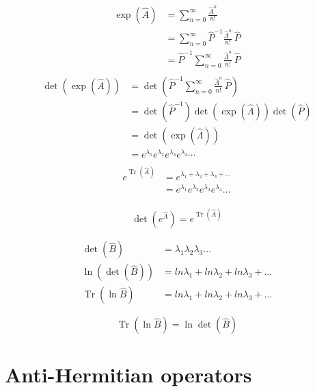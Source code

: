 \documentclass[12pt, letterpaper]{article}
\begin{document}
\begin{align*}
    \exp\left(\hat A\right) & = \sum_{n=0}^\infty \frac{\hat{A}^n} {n!} \\ 
    &= \sum_{n=0}^\infty  \hat{P}^{-1} \frac{\hat{\Lambda}^n} {n!}\, \hat{P}\\
    &= \hat{P}^{-1} \sum_{n=0}^\infty  \frac{\hat{\Lambda}^n} {n!}\, \hat{P}\\
\end{align*}
\begin{align*}
    \operatorname{det}\left(\exp\left(\hat A\right) \right)&= \operatorname{det}\left(\hat{P}^{-1} \sum_{n=0}^\infty  \frac{\hat{\Lambda}^n} {n!}\, \hat{P} \right)\\
    &= \operatorname{det}\left(\hat{P}^{-1}\right)\operatorname{det}\left(\exp\left(\hat \Lambda\right)\right)\operatorname{det}\left(\hat{P}\right)\\
    &= \operatorname{det}\left(\exp\left(\hat \Lambda\right)\right)\\
    &= e^{\lambda_1}e^{\lambda_2}e^{\lambda_3}e^{\lambda_4}\cdots\\
\end{align*}
\begin{align*}
    e^{\operatorname{Tr} \left(\hat A\right)}&=e^{\lambda_1+\lambda_2+\lambda_3+\ldots} \\
    &= e^{\lambda_1}e^{\lambda_2}e^{\lambda_3}e^{\lambda_4}\ldots\\
\end{align*}

\begin{equation*}\boxed{
    \operatorname{det}\left(e^{\hat{A}}\right)=e^{\operatorname{Tr}(\hat{A})}}
\end{equation*}

\begin{align*}
    \operatorname{det}\left(\hat B \right) &= \lambda_1 \lambda_2 \lambda_3 \ldots\\
    \ln\left(\operatorname{det}\left(\hat B \right)\right) & = ln \lambda_1+ ln \lambda_2+ ln \lambda_3+\ldots\\
    \operatorname{Tr}\left( \ln{\hat B} \right) &=  ln \lambda_1+ ln \lambda_2+ ln \lambda_3+\ldots
\end{align*}

\begin{equation*}
\boxed{ \operatorname{Tr}\left( \ln{\hat B} \right) = \ln{\operatorname{det}\left(\hat B\right)}}
\end{equation*}


\section{Anti-Hermitian operators}
\end{document}
